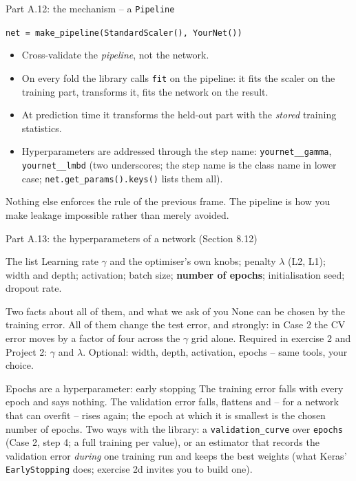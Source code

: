 \documentclass[10pt,aspectratio=169]{beamer}
\newcounter{case}
\begin{document}
\begin{frame}{Part A.12: the mechanism -- a \texttt{Pipeline}}
\small
\begin{center}
\large\texttt{net = make\_pipeline(StandardScaler(), YourNet())}
\end{center}
\begin{itemize}
  \item Cross-validate the \emph{pipeline}, not the network.
  \item On every fold the library calls \texttt{fit} on the pipeline: it
        fits the scaler on the training part, transforms it, fits the
        network on the result.
  \item At prediction time it transforms the held-out part with the
        \emph{stored} training statistics.
  \item Hyperparameters are addressed through the step name:
        \texttt{yournet\_\_gamma}, \texttt{yournet\_\_lmbd} (two
        underscores; the step name is the class name in lower case;
        \texttt{net.get\_params().keys()} lists them all).
\end{itemize}
\medskip
Nothing else enforces the rule of the previous frame.  The pipeline is
how you make leakage impossible rather than merely avoided.
\end{frame}

\begin{frame}{Part A.13: the hyperparameters of a network (Section 8.12)}
\small
\begin{block}{The list}
Learning rate $\gamma$ and the optimiser's own knobs; penalty $\lambda$
(L2, L1); width and depth; activation; batch size; \textbf{number of
epochs}; initialisation seed; dropout rate.
\end{block}
\begin{block}{Two facts about all of them, and what we ask of you}
None can be chosen by the training error.  All of them change the test
error, and strongly: in Case 2 the CV error moves by a factor of four
across the $\gamma$ grid alone.  Required in exercise 2 and Project 2:
$\gamma$ and $\lambda$.  Optional: width, depth, activation, epochs -- same
tools, your choice.
\end{block}
\begin{block}{Epochs are a hyperparameter: early stopping}
The training error falls with every epoch and says nothing.  The
validation error falls, flattens and -- for a network that can overfit --
rises again; the epoch at which it is smallest is the chosen number of
epochs.  Two ways with the library: a \texttt{validation\_curve} over
\texttt{epochs} (Case 2, step 4; a full training per value), or an
estimator that records the validation error \emph{during} one training
run and keeps the best weights (what Keras' \texttt{EarlyStopping} does;
exercise 2d invites you to build one).
\end{block}
\end{frame}
\end{document}
